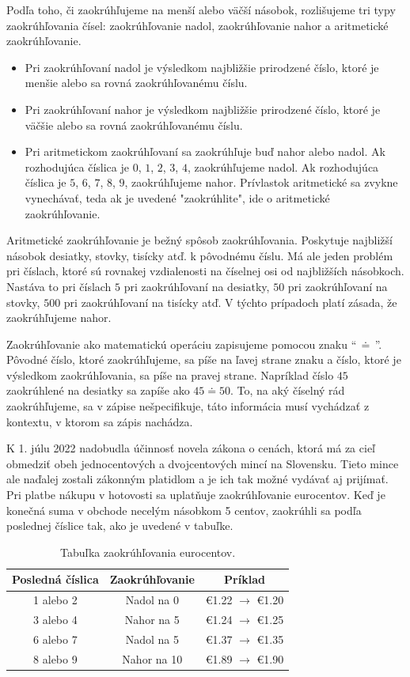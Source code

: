 \documentclass{article}
\begin{document}
Podľa toho, či zaokrúhľujeme na menší alebo väčší násobok, rozlišujeme tri typy zaokrúhľovania čísel: zaokrúhľovanie nadol, zaokrúhľovanie nahor a aritmetické zaokrúhľovanie.
\begin{itemize}
  \item Pri zaokrúhľovaní nadol je výsledkom najbližšie prirodzené číslo, ktoré je menšie alebo sa rovná zaokrúhľovanému číslu.
  \item Pri zaokrúhľovaní nahor je výsledkom najbližšie prirodzené číslo, ktoré je väčšie alebo sa rovná zaokrúhľovanému číslu.
  \item Pri aritmetickom zaokrúhľovaní sa zaokrúhľuje buď nahor alebo nadol. Ak rozhodujúca číslica je \(0\), \(1\), \(2\), \(3\), \(4\), zaokrúhľujeme nadol. Ak rozhodujúca číslica je \(5\), \(6\), \(7\), \(8\), \(9\), zaokrúhľujeme nahor. Prívlastok aritmetické sa zvykne vynechávať, teda ak je uvedené "zaokrúhlite", ide o aritmetické zaokrúhľovanie.
\end{itemize}
Aritmetické zaokrúhľovanie je bežný spôsob zaokrúhľovania. Poskytuje najbližší násobok desiatky, stovky, tisícky atď. k pôvodnému číslu. Má ale jeden problém pri číslach, ktoré sú rovnakej vzdialenosti na číselnej osi od najbližších násobkoch. Nastáva to pri číslach \(5\) pri zaokrúhľovaní na desiatky, \(50\) pri zaokrúhľovaní na stovky, \(500\) pri zaokrúhľovaní na tisícky atď. V týchto prípadoch platí zásada, že zaokrúhľujeme nahor.

Zaokrúhľovanie ako matematickú operáciu zapisujeme pomocou znaku \enquote{\(\, \doteq \,\)}. Pôvodné číslo, ktoré zaokrúhľujeme, sa píše na ľavej strane znaku a číslo, ktoré je výsledkom zaokrúhľovania, sa píše na pravej strane. Napríklad číslo \(45\) zaokrúhlené na desiatky sa zapíše ako \(45 \doteq 50\). To, na aký číselný rád zaokrúhľujeme, sa v zápise nešpecifikuje, táto informácia musí vychádzať z kontextu, v ktorom sa zápis nachádza.

K 1. júlu 2022 nadobudla účinnosť novela zákona o cenách, ktorá má za cieľ obmedziť obeh jednocentových a dvojcentových mincí na Slovensku. Tieto mince ale naďalej zostali zákonným platidlom a je ich tak možné vydávať aj prijímať. Pri platbe nákupu v hotovosti sa uplatňuje zaokrúhľovanie eurocentov. Keď je konečná suma v obchode necelým násobkom 5 centov, zaokrúhli sa podľa poslednej číslice tak, ako je uvedené v tabuľke.

\begin{table}[H]
  \centering
  \renewcommand{\arraystretch}{1.3}
  \begin{tabular}{|c|c|c|}
    \hline
    Posledná číslica & Zaokrúhľovanie & Príklad \\
    \hline
    1 alebo 2 & Nadol na 0 & \euro 1.22 \(\rightarrow\) \euro 1.20 \\
    3 alebo 4 & Nahor na 5 & \euro 1.24 \(\rightarrow\) \euro 1.25 \\
    6 alebo 7 & Nadol na 5 & \euro 1.37 \(\rightarrow\) \euro 1.35 \\
    8 alebo 9 & Nahor na 10 & \euro 1.89 \(\rightarrow\) \euro 1.90 \\
    \hline
  \end{tabular}
  \caption{Tabuľka zaokrúhľovania eurocentov.}
\end{table}
\end{document}
